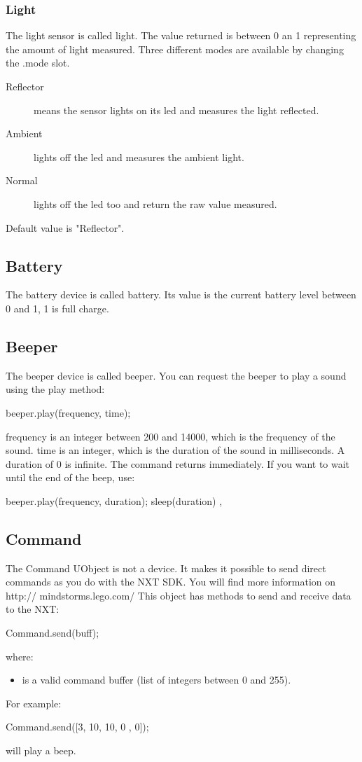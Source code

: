 \subsubsection{Light}
The light sensor is called light.  The value returned is between 0 an 1
representing the amount of light measured.  Three different modes are
available by changing the .mode slot.
\begin{description}
\item[Reflector] means the sensor lights on its led and measures the light
  reflected.
\item[Ambient] lights off the led and measures the ambient light.
\item[Normal] lights off the led too and return the raw value measured.
\end{description}
Default value is "Reflector".

\subsection{Battery}
The battery device is called battery.  Its value is the current battery
level between 0 and 1, 1 is full charge.
\subsection{Beeper}
The beeper device is called beeper.  You can request the beeper to play a
sound using the play method:
\begin{urbiunchecked}
beeper.play(frequency, time);
\end{urbiunchecked}

frequency is an integer between 200 and 14000, which is the frequency of the
sound. time is an integer, which is the duration of the sound in milliseconds.
A duration of 0 is infinite.
The command returns immediately. If you want to wait until the end of the beep,
use:
\begin{urbiunchecked}
{
  beeper.play(frequency, duration);
  sleep(duration)
},
\end{urbiunchecked}

\subsection{Command}
The Command UObject is not a device. It makes it possible to send direct
commands as you do with the NXT SDK. You will find more information on http://
mindstorms.lego.com/
This object has methods to send and receive data to the NXT:
\begin{urbiunchecked}
Command.send(buff);
\end{urbiunchecked}
where:
\begin{itemize}
\item {} is a valid command buffer (list of integers between 0 and
  255).
\end{itemize}
For example:
\begin{urbiunchecked}
Command.send([3, 10, 10, 0 , 0]);
\end{urbiunchecked}
will play a beep.


